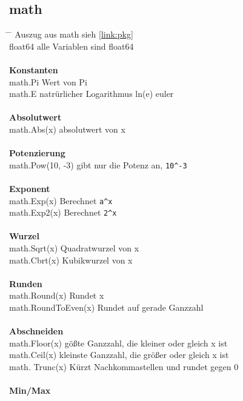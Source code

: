 \documentclass[twoside,a4paper,12pt]{article}
\begin{document}
\subsection{math}
\label{sec:math}
\begin{tabbing}
 \hspace{2mm} \= \hspace{50mm} \= \kill
 \> Auszug aus math \>  sieh \ref{link:pkg} \\
 \> float64 \> alle Variablen sind float64 \\
 \> \\
 \> \textbf{Konstanten} \\ 
 \> math.Pi \> Wert von Pi \\ 
 \> math.E \> natrürlicher Logarithmus ln(e) euler \\ 
 \> \\ 
 \> \textbf{Absolutwert} \\
 \> math.Abs(x)\> absolutwert von x \\ 
 \> \\
 \> \textbf{Potenzierung} \\ 
 \> math.Pow(10, -3)\> gibt nur die Potenz an, \verb|10^-3| \\
 \> \\
 \> \textbf{Exponent} \\ 
 \> math.Exp(x)  \> Berechnet \verb|a^x| \\ 
 \> math.Exp2(x)\> Berechnet \verb|2^x| \\
 \> \\
 \> \textbf{Wurzel} \\ 
 \> math.Sqrt(x)\> Quadratwurzel von x \\ 
 \> math.Cbrt(x)\> Kubikwurzel von x \\
 \> \\
 \> \textbf{Runden} \\
 \> math.Round(x)\> Rundet x \\ 
 \> math.RoundToEven(x)\> Rundet auf gerade Ganzzahl \\ 
 \> \\
 \> \textbf{Abschneiden} \\ 
 \> math.Floor(x)\> gößte Ganzzahl, die kleiner oder gleich x ist \\ 
 \> math.Ceil(x)\> kleinste Ganzzahl, die größer oder gleich x ist \\ 
 \> math. Trunc(x)\> Kürzt Nachkommastellen und rundet gegen 0 \\ 
 \> \\
 \> \textbf{Min/Max} \\ 

\end{tabbing}
\end{document}
